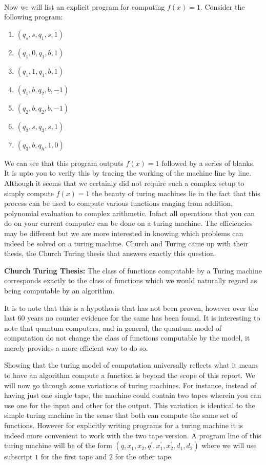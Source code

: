 \\ Now we will list an explicit program for computing $f(x)=1$.
Consider the following program:
\begin{enumerate}
    \item $ \left( q_s, s, q_1, s, 1 \right)$
    \item $ \left( q_1, 0, q_1, b, 1 \right)$
    \item $ \left( q_1, 1, q_1, b, 1 \right)$
    \item $ \left( q_1, b, q_2, b, -1 \right)$
    \item $ \left( q_2, b, q_2, b, -1 \right)$
    \item $ \left( q_2, s, q_3, s, 1 \right)$
    \item $ \left( q_3, b, q_h, 1, 0 \right)$
\end{enumerate}

We can see that this program outputs $f(x)=1$ followed by a series of blanks. It is upto you to verify this by tracing the working of the machine line by line.
Although it seems that we certainly did not require such a complex setup to simply compute $f(x) = 1$ the beauty of turing machines lie in the fact that this process can be used to compute various functions ranging from addition, polynomial evaluation to complex arithmetic. Infact all operations that you can do on your current computer can be done on a turing machine. The efficiencies may be different but we are more interested in knowing which problems can indeed be solved on a turing machine.
Church and Turing came up with their thesis, the Church Turing thesis that answers exactly this question.
\begin{thesis}
\textbf{Church Turing Thesis:} The class of functions computable by a Turing machine corresponds exactly to the class of functions which we would naturally regard as being computable by an algorithm.
\end{thesis}
It is to note that this is a hypothesis that has not been proven, however over the last 60 years no counter evidence for the same has been found.
It is interesting to note that quantum computers, and in general, the quantum model of computation do not change the class of functions computable by the model, it merely provides a more efficient way to do so.

Showing that the turing model of computation universally reflects what it means to have an algorithm compute a function is beyond the scope of this report. We will now go through some variations of turing machines. For instance, instead of having just one single tape, the machine could contain two tapes wherein you can use one for the input and other for the output. This variation is identical to the simple turing machine in the sense that both can compute the same set of functions. However for explicitly writing programs for a turing machine it is indeed more convenient to work with the two tape version.
A program line of this turing machine will be of the form $\left(q, x_1, x_2, q^{'}, x_1^{'}, x_2^{'}, d_1, d_2 \right)$ where we will use subscript $1$ for the first tape and $2$ for the other tape.

